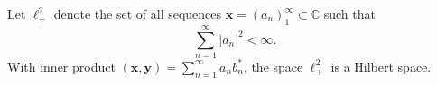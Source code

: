 Let $\ell^2_+$ denote the set of all sequences $\mathbf{x} = (a_n)_{1}^{\infty} \subset \mathbb{C}$ such that
$$\sum_{n=1}^{\infty} |a_n|^2 < \infty.$$
With inner product $(\mathbf{x}, \mathbf{y}) = \sum_{n=1}^{\infty} a_n b_n^*$, the space $\ell^2_+$ is a Hilbert space.
